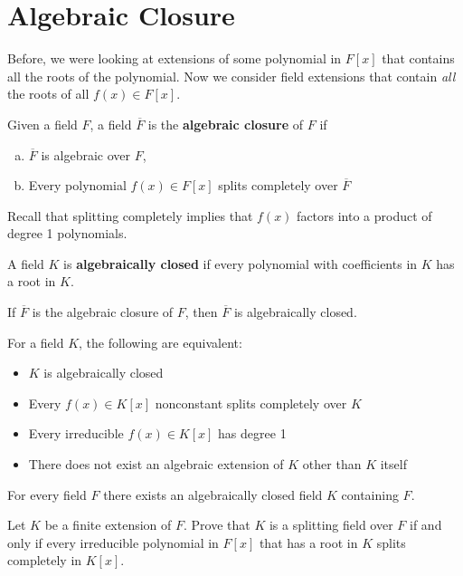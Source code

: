 \documentclass{memoir}
\begin{document}


\section{Algebraic Closure}
\label{sec:algebraic_closure}

Before, we were looking at extensions of some polynomial in \(F[x]\) that contains all the roots of the polynomial. Now we consider field extensions that contain \textit{all} the roots of all \(f(x) \in F[x]\).

\begin{defn}
	Given a field \(F\), a field \(\overline{F}\) is the \textbf{algebraic closure} of \(F\) if
	\begin{enumerate}[(a).]
		\item \(\overline{F}\) is algebraic over \(F\),
		\item Every polynomial \(f(x) \in F[x]\) splits completely over \(\overline{F}\)
	\end{enumerate}
\end{defn}
Recall that splitting completely implies that \(f(x)\) factors into a product of degree 1 polynomials.

\begin{defn}
	A field \(K\) is \textbf{algebraically closed} if every polynomial with coefficients in \(K\) has a root in \(K\).
\end{defn}

\begin{prop}
	If \(\overline{F}\) is the algebraic closure of \(F\), then \(\overline{F}\) is algebraically closed.
\end{prop}

\begin{hw}
	For a field \(K\), the following are equivalent:
	\begin{itemize}
		\item \(K\) is algebraically closed
		\item Every \(f(x)\in K[x]\) nonconstant splits completely over \(K\) 
		\item Every irreducible \(f(x) \in K[x]\) has degree 1
		\item There does not exist an algebraic extension of \(K\) other than \(K\) itself
	\end{itemize}
\end{hw}

\begin{prop}
	For every field \(F\) there exists an algebraically closed field \(K\) containing \(F\).
\end{prop}

\begin{hw}%
	Let \(K\) be a finite extension of \(F\). Prove that \(K\) is a splitting field over \(F\) if and only if every irreducible polynomial in \(F[x]\) that has a root in \(K\) splits completely in \(K[x]\).
\end{hw}
\end{document}
